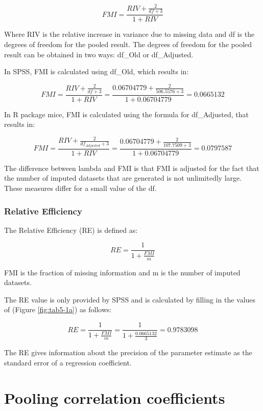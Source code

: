 \documentclass[]{book}
\theoremstyle{definition}
\theoremstyle{definition}
\theoremstyle{definition}
\theoremstyle{remark}
\begin{document}
\begin{equation}
FMI = \frac{RIV + \frac{2}{df+3}}{1+RIV}
  \label{eq:riv}
\end{equation}

Where RIV is the relative increase in variance due to missing data and
df is the degrees of freedom for the pooled result. The degrees of
freedom for the pooled result can be obtained in two ways: df\_Old or
df\_Adjusted.

In SPSS, FMI is calculated using df\_Old, which results in:

\[FMI = \frac{RIV + \frac{2}{df+3}}{1+RIV}=\frac{0.06704779 + \frac{2}{506.5576+3}}{1+0.06704779}=0.0665132\]

In R package mice, FMI is calculated using the formula for df\_Adjusted,
that results in:

\[FMI = \frac{RIV + \frac{2}{df_{Adjusted}+3}}{1+RIV}=\frac{0.06704779 + \frac{2}{107.7509+3}}{1+0.06704779}=0.0797587\]

The difference between lambda and FMI is that FMI is adjusted for the
fact that the number of imputed datasets that are generated is not
unlimitedly large. These measures differ for a small value of the df.

\subsection{Relative Efficiency}\label{relative-efficiency}

The Relative Efficiency (RE) is defined as:

\begin{equation}
RE = \frac{1}{1+\frac{FMI}{m}}
  \label{eq:re}
\end{equation}

FMI is the fraction of missing information and m is the number of
imputed datasets.

The RE value is only provided by SPSS and is calculated by filling in
the values of (Figure \ref{fig:tab5-1a}) as follows:

\[RE = \frac{1}{1+\frac{FMI}{m}}=\frac{1}{1+\frac{0.0665132}{3}}=0.9783098\]

The RE gives information about the precision of the parameter estimate
as the standard error of a regression coefficient.

\chapter{Pooling correlation
coefficients}\label{pooling-correlation-coefficients-1}
\end{document}
